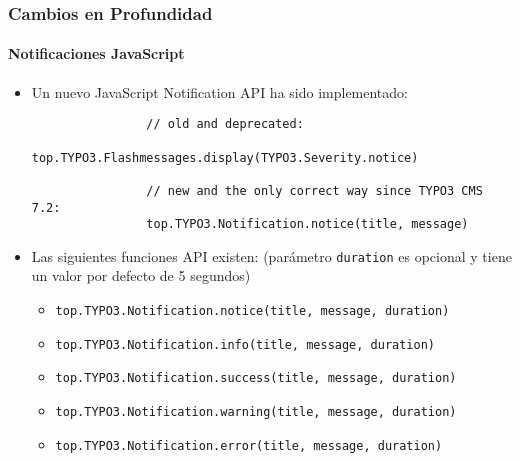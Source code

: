 \begin{frame}[fragile]
	\frametitle{Cambios en Profundidad}
	\framesubtitle{Notificaciones JavaScript}

	\begin{itemize}

		\item Un nuevo JavaScript Notification API ha sido implementado:
			\begin{lstlisting}
				// old and deprecated:
				top.TYPO3.Flashmessages.display(TYPO3.Severity.notice)

				// new and the only correct way since TYPO3 CMS 7.2:
				top.TYPO3.Notification.notice(title, message)
    		\end{lstlisting}

		\item Las siguientes funciones API existen:\newline
			\small(parámetro \texttt{duration} es opcional y tiene un valor por defecto de 5 segundos)\normalsize
			\begin{itemize}
				\item \normalsize\smaller\texttt{top.TYPO3.Notification.notice(title, message, duration)}\normalsize
				\item \smaller\texttt{top.TYPO3.Notification.info(title, message, duration)}\normalsize
				\item \smaller\texttt{top.TYPO3.Notification.success(title, message, duration)}\normalsize
				\item \smaller\texttt{top.TYPO3.Notification.warning(title, message, duration)}\normalsize
				\item \smaller\texttt{top.TYPO3.Notification.error(title, message, duration)}\normalsize
			\end{itemize}

	\end{itemize}

\end{frame}

